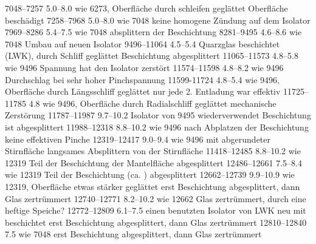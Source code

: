 \begin{tabbing}
    {7048--7257}
    {5.0--8.0}
    {wie 6273, Oberfläche durch schleifen geglättet}
    {Oberfläche beschädigt}
    {7258--7968}
    {5.0--8.0}
    {wie 7048}
    {keine homogene Zündung auf dem Isolator}
    {7969--8286}
    {5.4--7.5}
    {wie 7048}
    {absplittern der Beschichtung}
    {8281--9495}
    {4.6--8.6}
    {wie 7048}
    {Umbau auf neuen Isolator}
    {9496--11064}
    {4.5--5.4}
    {Quarzglas \AlO beschichtet (LWK), durch Schliff geglättet}
    {Beschichtung abgesplittert}
    {11065--11573}
    {4.8--5.8}
    {wie 9496}
    {Spannung hat den Isolator zerstört}
    {11574--11598}
    {4.8--8.2}
    {wie 9496}
    {Durchschlag bei sehr hoher Pinchspannung}
    {11599-11724}
    {4.8--5.4}
    {wie 9496, Oberfläche durch Längsschliff geglättet}
    {nur jede 2. Entladung war effektiv}
    {11725--11785}
    {4.8}
    {wie 9496, Oberfläche durch Radialschliff geglättet}
    {mechanische Zerstörung}
    {11787--11987}
    {9.7--10.2}
    {Isolator von 9495 wiederverwendet}
    {Beschichtung ist abgesplittert}
    {11988--12318}
    {8.8--10.2}
    {wie 9496}
    {nach Abplatzen der Beschichtung keine effektiven Pinche}
    {12319--12417}
    {9.0--9.4}
    {wie 9496 mit abgerundeter Stirnfläche}
    {langsames Absplittern von der Stirnfläche}
    {11418--12485}
    {8.8--10.2}
    {wie 12319}
    {Teil der Beschichtung der Mantelfläche abgesplittert}
    {12486--12661}
    {7.5--8.4}
    {wie 12319}
    {Teil der Beschichtung (ca. ) abgesplittert}
    {12662--12739}
    {9.9--10.9}
    {wie 12319, Oberfläche etwas stärker geglättet}
    {erst Beschichtung abgesplittert, dann Glas zertrümmert}
    {12740--12771}
    {8.2--10.2}
    {wie 12662}
    {Glas zertrümmert, durch eine heftige Speiche?}
    {12772--12809}
    {6.1--7.5}
    {einen benutzten Isolator von LWK neu mit \AlO beschichtet}
    {erst Beschichtung abgesplittert, dann Glas zertrümmert}
    {12810--12840}
    {7.5}
    {wie 7048}
    {erst Beschichtung abgesplittert, dann Glas zertrümmert}
\end{tabbing}
%
%
\nocite{kopka:latex}
